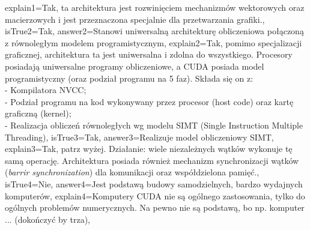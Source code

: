 \begin{enumerate}
\begin{minipage}{\textwidth}
{		explain1={Tak, ta architektura jest rozwinięciem mechanizmów wektorowych oraz macierzowych i jest przeznaczona specjalnie dla przetwarzania grafiki.},%
		isTrue2={Tak},%
		answer2={Stanowi uniwersalną architekturę obliczeniowa połączoną z równoległym modelem programistycznym},%
		explain2={Tak, pomimo specjalizacji graficznej, architektura ta jest uniwersalna i zdolna do wszystkiego. Procesory posiadają uniwersalne programy obliczeniowe, a CUDA posiada model programistyczny (oraz podział programu na 5 faz). Składa się on z:\\- Kompilatora NVCC;\\- Podział programu na kod wykonywany przez procesor (host code) oraz kartę graficzną (kernel);\\- Realizacja obliczeń równoległych wg modelu SIMT (Single Instruction Multiple Threading)},%
		isTrue3={Tak},%
		answer3={Realizuje model obliczeniowy SIMT},%
		explain3={Tak, patrz wyżej. Działanie: wiele niezależnych wątków wykonuje tę samą operację. Architektura posiada również mechanizm synchronizacji wątków (\emph{barrir synchronization}) dla komunikacji oraz współdzielona pamięć.},%
		isTrue4={Nie},%
		answer4={Jest podstawą budowy samodzielnych, bardzo wydajnych komputerów},%
		explain4={Komputery CUDA nie są ogólnego zastosowania, tylko do ogólnych problemów numerycznych. Na pewno nie są podstawą, bo np. komputer ... (dokończyć by trza)},%
	}
\end{minipage}
\begin{minipage}{\textwidth}
\end{minipage}
\begin{minipage}{\textwidth}
\end{minipage}
\end{enumerate}
